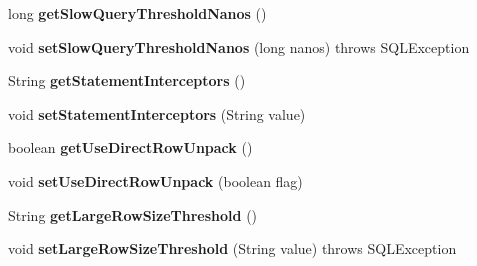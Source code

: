 \begin{DoxyCompactItemize}
\item 
\mbox{\label{classcom_1_1mysql_1_1jdbc_1_1_connection_properties_impl_a7f0746f426453d2f32e441c9a2cf3021}} 
long {\bfseries get\+Slow\+Query\+Threshold\+Nanos} ()
\item 
\mbox{\label{classcom_1_1mysql_1_1jdbc_1_1_connection_properties_impl_a0c82d111607ef2f13ef30d50d302adb3}} 
void {\bfseries set\+Slow\+Query\+Threshold\+Nanos} (long nanos)  throws S\+Q\+L\+Exception 
\item 
\mbox{\label{classcom_1_1mysql_1_1jdbc_1_1_connection_properties_impl_a666dd06c2805680f6cde2c156ad4bb0d}} 
String {\bfseries get\+Statement\+Interceptors} ()
\item 
\mbox{\label{classcom_1_1mysql_1_1jdbc_1_1_connection_properties_impl_a0040b946c940e875f93d89814050cde9}} 
void {\bfseries set\+Statement\+Interceptors} (String value)
\item 
\mbox{\label{classcom_1_1mysql_1_1jdbc_1_1_connection_properties_impl_ae0c0103b8949c2b2fcfc8b12c192ad05}} 
boolean {\bfseries get\+Use\+Direct\+Row\+Unpack} ()
\item 
\mbox{\label{classcom_1_1mysql_1_1jdbc_1_1_connection_properties_impl_a22aeb69c39d2615b50535ef140d44cf8}} 
void {\bfseries set\+Use\+Direct\+Row\+Unpack} (boolean flag)
\item 
\mbox{\label{classcom_1_1mysql_1_1jdbc_1_1_connection_properties_impl_a82fa28ff79a30034f66ade4ed87ddbca}} 
String {\bfseries get\+Large\+Row\+Size\+Threshold} ()
\item 
\mbox{\label{classcom_1_1mysql_1_1jdbc_1_1_connection_properties_impl_a8cf0312cbfbbd2601b9fa035c435109f}} 
void {\bfseries set\+Large\+Row\+Size\+Threshold} (String value)  throws S\+Q\+L\+Exception 
\item 

\end{DoxyCompactItemize}
